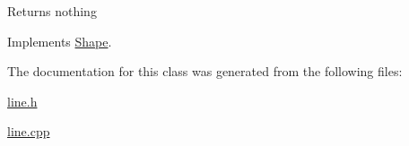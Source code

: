 \begin{DoxyReturn}{Returns}
nothing 
\end{DoxyReturn}


Implements \hyperlink{classShape_a140551e1a4fc2c4d8cf8d2e01c5a5932}{Shape}.



The documentation for this class was generated from the following files\-:\begin{DoxyCompactItemize}
\item 
\hyperlink{line_8h}{line.\-h}\item 
\hyperlink{line_8cpp}{line.\-cpp}\end{DoxyCompactItemize}

